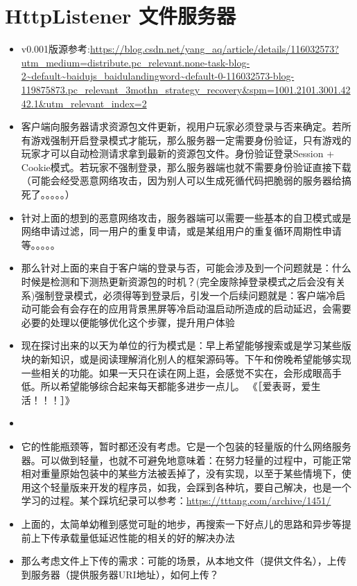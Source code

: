 \documentclass[9pt, b5paper]{article}
\begin{document}
\section{HttpListener 文件服务器}
\label{sec-8}
\begin{itemize}
\item v0.001版源参考:\url{https://blog.csdn.net/yang_aq/article/details/116032573?utm_medium=distribute.pc_relevant.none-task-blog-2~default~baidujs_baidulandingword~default-0-116032573-blog-119875873.pc_relevant_3mothn_strategy_recovery&spm=1001.2101.3001.4242.1&utm_relevant_index=2}
\item 客户端向服务器请求资源包文件更新，视用户玩家必须登录与否来确定。若所有游戏强制开启登录模式才能玩，那么服务器一定需要身份验证，只有游戏的玩家才可以自动检测请求拿到最新的资源包文件。身份验证登录Session + Cookie模式。若玩家不强制登录，那么服务器端也就不需要身份验证直接下载（可能会经受恶意网络攻击，因为别人可以生成死循代码把脆弱的服务器给搞死了。。。。。）
\item 针对上面的想到的恶意网络攻击，服务器端可以需要一些基本的自卫模式或是网络申请过滤，同一用户的重复申请，或是某组用户的重复循环周期性申请等。。。。。
\item 那么针对上面的来自于客户端的登录与否，可能会涉及到一个问题就是：什么时候是检测和下测热更新资源包的时机？(完全废除掉登录模式之后会没有关系)强制登录模式，必须得等到登录后，引发一个后续问题就是：客户端冷启动可能会有会存在的应用背景黑屏等冷启动温启动所造成的启动延迟，会需要必要的处理以便能够优化这个步骤，提升用户体验
\item 现在探讨出来的以天为单位的行为模式是：早上希望能够搜索或是学习某些版块的新知识，或是阅读理解消化别人的框架源码等。下午和傍晚希望能够实现一些相关的功能。如果一天只在读在网上逛，会感觉不实在，会形成眼高手低。所以希望能够综合起来每天都能多进步一点儿。  《［爱表哥，爱生活！！！］》
\item 
\item 它的性能瓶颈等，暂时都还没有考虑。它是一个包装的轻量版的什么网络服务器。可以做到轻量，也就不可避免地意味着：在努力轻量的过程中，可能正常相对重量原始包装中的某些方法被丢掉了，没有实现，以至于某些情境下，使用这个轻量版来开发的程序员，如我，会踩到各种坑，要自己解决，也是一个学习的过程。某个踩坑纪录可以参考：\url{https://tttang.com/archive/1451/}
\item 上面的，太简单幼稚到感觉可耻的地步，再搜索一下好点儿的思路和异步等提前上下传承载量低延迟性能的相关的好的解决办法
\item 那么考虑文件上下传的需求：可能的场景，从本地文件（提供文件名），上传到服务器（提供服务器URI地址），如何上传？

\end{itemize}
\end{document}
